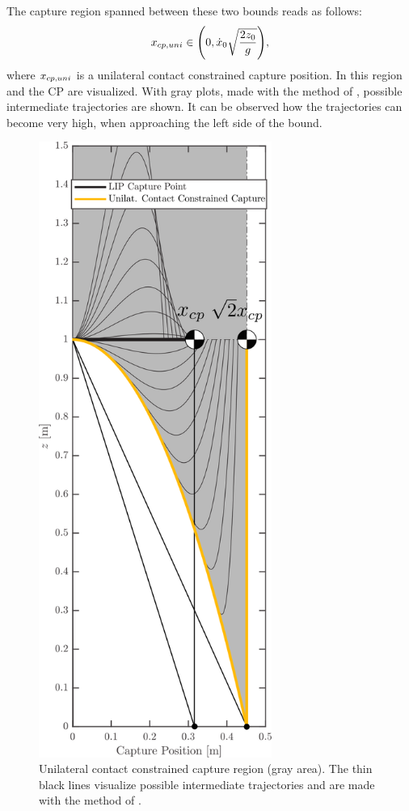 The capture region spanned between these two bounds reads as follows:
\begin{equation}
x_{cp,uni} \in \Bigg(0, \dot{x}_0\sqrt{\frac{2z_0}{g}} \Bigg),
\label{eq:xcpuni}
\end{equation}
where $x_{cp,uni}$ is a unilateral contact constrained capture position. In  this region and the \ac{CP} are visualized. With gray plots, made with the method of \cite{koolen2016balance}, possible intermediate trajectories are shown. It can be observed how the trajectories can become very high, when approaching the left side of the bound.  

\begin{figure}
\centering
\includegraphics[width=3.0in]{STYLESTUFF/CPvsBalistic4.png}
\caption{Unilateral contact constrained capture region (gray area). The thin black lines visualize possible intermediate trajectories and are made with the method of \cite{koolen2016balance}.}
\label{fig:cpbal}
\end{figure}

